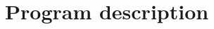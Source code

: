 \appendix
\makeatletter
\def\Pref@section{Appendix~}
\def\@seccntformat#1{\csname Pref@#1\endcsname \csname the#1\endcsname\quad}
\makeatother

\section{Program description}
\label{Appendix}
